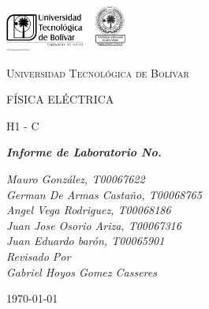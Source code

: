 \documentclass[10pt]{article}
\begin{document}
\begin{titlepage}
	\centering
	\includegraphics[width=0.3\textwidth]{Images/logo_utb.png}\par\vspace{1cm}
	{\scshape\LARGE Universidad Tecnológica de Bolívar \par}
	\vspace{4cm}

	{\scshape\Large FÍSICA ELÉCTRICA \par}
	\vspace{.8cm}

	{\scshape\Large H1 - C \par}
	\vspace{2.5cm}
	\slshape {\Large \bfseries{}Informe de Laboratorio No.  \\}
	\vspace{2.5cm}

	\slshape {\itshape{} Mauro González, T00067622 \\}
	\slshape {\itshape{} German De Armas Castaño, T00068765 \\}
	\slshape {\itshape{} Angel Vega Rodriguez, T00068186 \\}
	\slshape {\itshape{} Juan Jose Osorio Ariza, T00067316 \\}
	\slshape {\itshape{} Juan Eduardo barón, T00065901 \\}
	\vfill
	Revisado Por \\
	Gabriel Hoyos Gomez Casseres\\
	{\large \today\par}
\end{titlepage}
\end{document}
